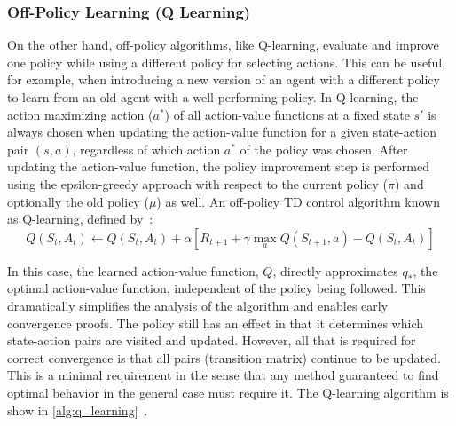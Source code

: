 \documentclass[../xlapes02]{subfiles}
\begin{document}
    \subsubsection{Off-Policy Learning (Q Learning)}\label{sec:td-q-learning}
    On the other hand, off-policy algorithms, like Q-learning, evaluate and improve one policy while using a different policy for selecting actions. This can be useful, for example, when introducing a new version of an agent with a different policy to learn from an old agent with a well-performing policy. In Q-learning, the action maximizing action ($ a^* $) of all action-value functions at a fixed state $ s' $ is always chosen when updating the action-value function for a given state-action pair $ (s, a) $, regardless of which action $ a^* $ of the policy was chosen. After updating the action-value function, the policy improvement step is performed using the epsilon-greedy approach with respect to the current policy ($ \pi $) and optionally the old policy ($ \mu $) as well. An off-policy TD control algorithm known as Q-learning, defined by~\cite{FITMT25127, sutton2018reinforcement}:
    \begin{equation}
        \label{eq:q-learning}
        Q(S_t,A_t)\leftarrow Q(S_t,A_t)+\alpha\left[R_{t+1}+\gamma\max_a Q(S_{t+1},a)-Q(S_t,A_t)\right]
    \end{equation}

    In this case, the learned action-value function, $Q$, directly approximates $q_*$, the optimal action-value function, independent of the policy being followed. This dramatically simplifies the analysis of the algorithm and enables early convergence proofs. The policy still has an effect in that it determines which state-action pairs are visited and updated. However, all that is required for correct convergence is that all pairs (transition matrix) continue to be updated. This is a minimal requirement in the sense that any method guaranteed to find optimal behavior in the general case must require it. The Q-learning algorithm is show in \cref{alg:q_learning}~\cite{rl-course-david-silver, sutton2018reinforcement}.

\end{document}
